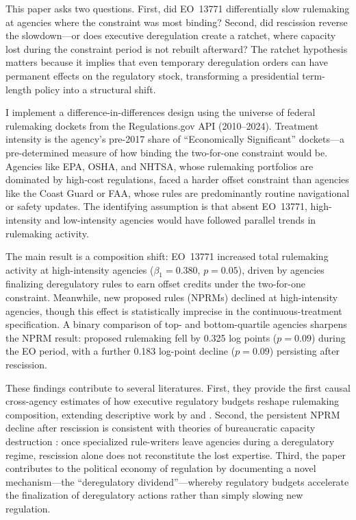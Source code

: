 \documentclass[12pt]{article}
\begin{document}
This paper asks two questions. First, did EO~13771 differentially slow rulemaking at agencies where the constraint was most binding? Second, did rescission reverse the slowdown---or does executive deregulation create a ratchet, where capacity lost during the constraint period is not rebuilt afterward? The ratchet hypothesis matters because it implies that even temporary deregulation orders can have permanent effects on the regulatory stock, transforming a presidential term-length policy into a structural shift.

I implement a difference-in-differences design using the universe of federal rulemaking dockets from the Regulations.gov API (2010--2024). Treatment intensity is the agency's pre-2017 share of ``Economically Significant'' dockets---a pre-determined measure of how binding the two-for-one constraint would be. Agencies like EPA, OSHA, and NHTSA, whose rulemaking portfolios are dominated by high-cost regulations, faced a harder offset constraint than agencies like the Coast Guard or FAA, whose rules are predominantly routine navigational or safety updates. The identifying assumption is that absent EO~13771, high-intensity and low-intensity agencies would have followed parallel trends in rulemaking activity.

The main result is a composition shift: EO~13771 increased total rulemaking activity at high-intensity agencies ($\beta_1 = 0.380$, $p = 0.05$), driven by agencies finalizing deregulatory rules to earn offset credits under the two-for-one constraint. Meanwhile, new proposed rules (NPRMs) declined at high-intensity agencies, though this effect is statistically imprecise in the continuous-treatment specification. A binary comparison of top- and bottom-quartile agencies sharpens the NPRM result: proposed rulemaking fell by 0.325 log points ($p = 0.09$) during the EO period, with a further 0.183 log-point decline ($p = 0.09$) persisting after rescission.

These findings contribute to several literatures. First, they provide the first causal cross-agency estimates of how executive regulatory budgets reshape rulemaking composition, extending descriptive work by \citet{desilvestrini2024eo13771} and \citet{coglianese2020regulatory}. Second, the persistent NPRM decline after rescission is consistent with theories of bureaucratic capacity destruction \citep{carpenter2004deadline, potter2017trump}: once specialized rule-writers leave agencies during a deregulatory regime, rescission alone does not reconstitute the lost expertise. Third, the paper contributes to the political economy of regulation \citep{peltzman1976toward, mulligan2012regulation} by documenting a novel mechanism---the ``deregulatory dividend''---whereby regulatory budgets accelerate the finalization of deregulatory actions rather than simply slowing new regulation.
\end{document}
